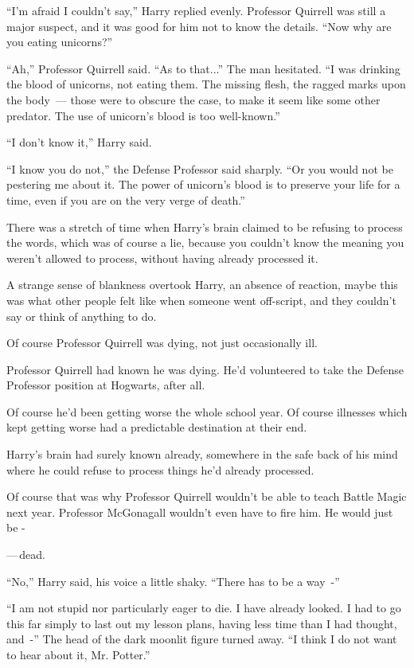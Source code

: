 ``I'm afraid I couldn't say,'' Harry replied evenly. Professor Quirrell was still a major suspect, and it was good for him not to know the details. ``Now why are you eating unicorns?''

``Ah,'' Professor Quirrell said. ``As to that...'' The man hesitated. ``I was drinking the blood of unicorns, not eating them. The missing flesh, the ragged marks upon the body~--- those were to obscure the case, to make it seem like some other predator. The use of unicorn's blood is too well-known.''

``I don't know it,'' Harry said.

``I know you do not,'' the Defense Professor said sharply. ``Or you would not be pestering me about it. The power of unicorn's blood is to preserve your life for a time, even if you are on the very verge of death.''

There was a stretch of time when Harry's brain claimed to be refusing to process the words, which was of course a lie, because you couldn't know the meaning you weren't allowed to process, without having already processed it.

A strange sense of blankness overtook Harry, an absence of reaction, maybe this was what other people felt like when someone went off-script, and they couldn't say or think of anything to do.

Of course Professor Quirrell was dying, not just occasionally ill.

Professor Quirrell had known he was dying. He'd volunteered to take the Defense Professor position at Hogwarts, after all.

Of course he'd been getting worse the whole school year. Of course illnesses which kept getting worse had a predictable destination at their end.

Harry's brain had surely known already, somewhere in the safe back of his mind where he could refuse to process things he'd already processed.

Of course that was why Professor Quirrell wouldn't be able to teach Battle Magic next year. Professor McGonagall wouldn't even have to fire him. He would just be -

---\,dead.

``No,'' Harry said, his voice a little shaky. ``There has to be a way~-''

``I am not stupid nor particularly eager to die. I have already looked. I had to go this far simply to last out my lesson plans, having less time than I had thought, and~-'' The head of the dark moonlit figure turned away. ``I think I do not want to hear about it, Mr. Potter.''

